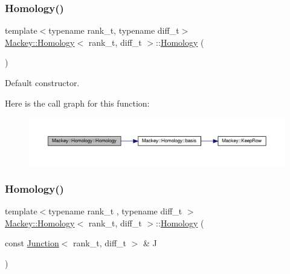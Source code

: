 \subsubsection{\texorpdfstring{Homology()}{Homology()}\hspace{0.1cm}{\footnotesize\ttfamily [1/2]}}
{\footnotesize\ttfamily template$<$typename rank\+\_\+t, typename diff\+\_\+t$>$ \\
\hyperlink{classMackey_1_1Homology}{Mackey\+::\+Homology}$<$ rank\+\_\+t, diff\+\_\+t $>$\+::\hyperlink{classMackey_1_1Homology}{Homology} (\begin{DoxyParamCaption}{ }\end{DoxyParamCaption})\hspace{0.3cm}{\ttfamily [inline]}}



Default constructor. 

Here is the call graph for this function\+:\nopagebreak
\begin{figure}[H]
\begin{center}
\leavevmode
\includegraphics[width=350pt]{classMackey_1_1Homology_a3580b194f986bd59a02fb84db97e00f2_cgraph}
\end{center}
\end{figure}
\mbox{\label{classMackey_1_1Homology_a31e26f0fb8e1cd7f0506ae1dbc97ea22}} 
\subsubsection{\texorpdfstring{Homology()}{Homology()}\hspace{0.1cm}{\footnotesize\ttfamily [2/2]}}
{\footnotesize\ttfamily template$<$typename rank\+\_\+t , typename diff\+\_\+t $>$ \\
\hyperlink{classMackey_1_1Homology}{Mackey\+::\+Homology}$<$ rank\+\_\+t, diff\+\_\+t $>$\+::\hyperlink{classMackey_1_1Homology}{Homology} (\begin{DoxyParamCaption}\item[{const \hyperlink{classMackey_1_1Junction}{Junction}$<$ rank\+\_\+t, diff\+\_\+t $>$ \&}]{J }\end{DoxyParamCaption})}



